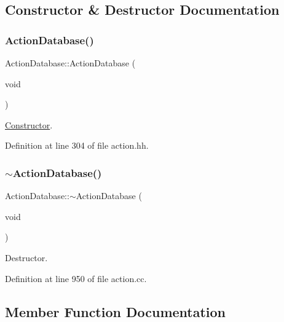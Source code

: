 \subsection{Constructor \& Destructor Documentation}
\mbox{\label{class_action_database_a764e870dbcefd5f771695caba317e8e1}} 
\subsubsection{\texorpdfstring{ActionDatabase()}{ActionDatabase()}}
{\footnotesize\ttfamily Action\+Database\+::\+Action\+Database (\begin{DoxyParamCaption}\item[{void}]{ }\end{DoxyParamCaption})\hspace{0.3cm}{\ttfamily [inline]}}



\mbox{\hyperlink{class_constructor}{Constructor}}. 



Definition at line 304 of file action.\+hh.

\mbox{\label{class_action_database_ad00598cb3da2f8bb682a4bdfabf7e6c0}} 
\subsubsection{\texorpdfstring{$\sim$ActionDatabase()}{~ActionDatabase()}}
{\footnotesize\ttfamily Action\+Database\+::$\sim$\+Action\+Database (\begin{DoxyParamCaption}\item[{void}]{ }\end{DoxyParamCaption})}



Destructor. 



Definition at line 950 of file action.\+cc.



\subsection{Member Function Documentation}
\mbox{\label{class_action_database_a7b00339734448a709998615ced5cbd04}} 
